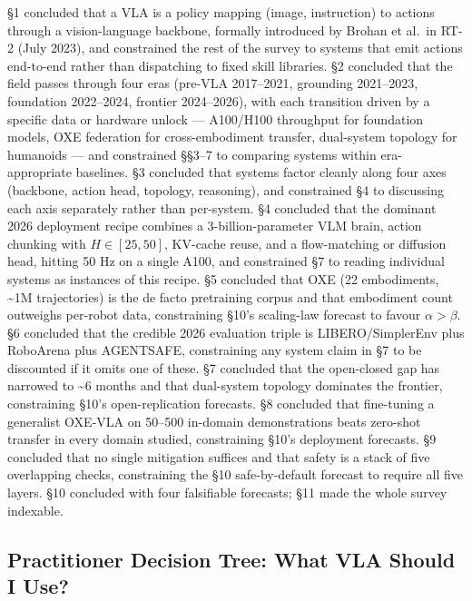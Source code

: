 §1 concluded that a VLA is a policy mapping (image, instruction) to actions through a vision-language backbone, formally introduced by Brohan et al.~in RT-2 (July 2023), and constrained the rest of the survey to systems that emit actions end-to-end rather than dispatching to fixed skill libraries. §2 concluded that the field passes through four eras (pre-VLA 2017--2021, grounding 2021--2023, foundation 2022--2024, frontier 2024--2026), with each transition driven by a specific data or hardware unlock --- A100/H100 throughput for foundation models, OXE federation for cross-embodiment transfer, dual-system topology for humanoids --- and constrained §§3--7 to comparing systems within era-appropriate baselines. §3 concluded that systems factor cleanly along four axes (backbone, action head, topology, reasoning), and constrained §4 to discussing each axis separately rather than per-system. §4 concluded that the dominant 2026 deployment recipe combines a 3-billion-parameter VLM brain, action chunking with \(H \in [25, 50]\), KV-cache reuse, and a flow-matching or diffusion head, hitting 50 Hz on a single A100, and constrained §7 to reading individual systems as instances of this recipe. §5 concluded that OXE (22 embodiments, \textasciitilde1M trajectories) is the de facto pretraining corpus and that embodiment count outweighs per-robot data, constraining §10's scaling-law forecast to favour \(\alpha > \beta\). §6 concluded that the credible 2026 evaluation triple is LIBERO/SimplerEnv plus RoboArena plus AGENTSAFE, constraining any system claim in §7 to be discounted if it omits one of these. §7 concluded that the open-closed gap has narrowed to \textasciitilde6 months and that dual-system topology dominates the frontier, constraining §10's open-replication forecasts. §8 concluded that fine-tuning a generalist OXE-VLA on 50--500 in-domain demonstrations beats zero-shot transfer in every domain studied, constraining §10's deployment forecasts. §9 concluded that no single mitigation suffices and that safety is a stack of five overlapping checks, constraining the §10 safe-by-default forecast to require all five layers. §10 concluded with four falsifiable forecasts; §11 made the whole survey indexable.

\subsection{Practitioner Decision Tree: What VLA Should I Use?}\label{practitioner-decision-tree-what-vla-should-i-use}

